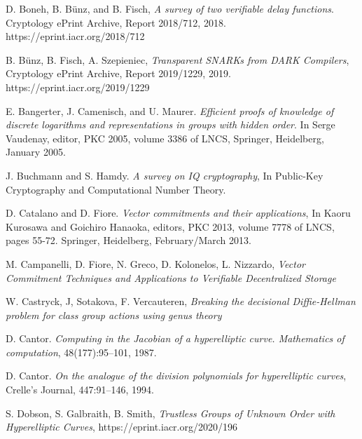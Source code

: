 \documentclass[11pt, lettersize, notitlepage, leqno, footskip=0.6cm]{article}
\newcommand{\noin}{\noindent}
\numberwithin{equation}{section}
\begin{document}
\noin [BBF18] D. Boneh, B. B\"{u}nz, and B. Fisch, \textit{A survey of two verifiable delay functions}. Cryptology ePrint Archive, Report 2018/712, 2018. https://eprint.iacr.org/2018/712 \vspace{0.1cm}

\noindent [BFS19] B. B\"{u}nz, B. Fisch, A. Szepieniec, \textit{Transparent SNARKs from DARK Compilers}, Cryptology ePrint Archive, Report 2019/1229, 2019. https://eprint.iacr.org/2019/1229 \vspace{0.1cm}

\noin [BCM05] E. Bangerter, J. Camenisch, and U. Maurer. \textit{Efficient proofs of knowledge of discrete logarithms and representations in groups with hidden order}. In Serge Vaudenay, editor, PKC 2005, volume 3386 of LNCS, Springer, Heidelberg, January 2005.\vspace{0.1cm}

\noin [BH01] J. Buchmann and S. Hamdy. \textit{A survey on IQ cryptography}, In Public-Key Cryptography and Computational Number Theory. \vspace{0.1cm}

\noin [CF13] D. Catalano and D. Fiore. \textit{Vector commitments and their applications}, In Kaoru Kurosawa and Goichiro Hanaoka, editors, PKC 2013, volume 7778 of LNCS, pages 55-72. Springer, Heidelberg, February/March 2013.

\noindent [CFGKN20] M. Campanelli, D. Fiore, N. Greco, D. Kolonelos, L. Nizzardo, \textit{Vector Commitment Techniques and Applications to Verifiable Decentralized Storage} \vspace{0.1cm}

\noin [CSV20] W. Castryck, J, Sotakova, F. Vercauteren, \textit{Breaking the decisional Diffie-Hellman problem for class group actions using genus theory}\vspace{0.1cm}

\noindent [Can87] D. Cantor. \textit{Computing in the Jacobian of a hyperelliptic curve. Mathematics of computation}, 48(177):95–101, 1987.\vspace{0.1cm}

\noindent [Can94] D. Cantor. \textit{On the analogue of the division polynomials for hyperelliptic curves}, Crelle's Journal, 447:91–146, 1994.\vspace{0.1cm}


\noindent [DGS20] S. Dobson, S. Galbraith, B. Smith, \textit{Trustless Groups of Unknown Order with Hyperelliptic Curves}, https://eprint.iacr.org/2020/196\vspace{0.1cm}
\end{document}
